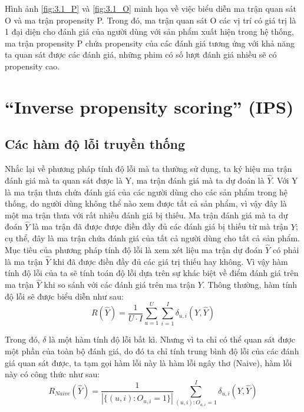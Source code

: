 Hình ảnh \ref{fig:3.1_P} và \ref{fig:3.1_O} minh họa về việc biểu diễn ma trận quan sát O và ma trận propensity P. Trong đó, ma trận quan sát O các vị trí có giá trị là 1 đại diện cho đánh giá của người dùng với sản phẩm xuất hiện trong hệ thống, ma trận propensity P chứa propensity của các đánh giá tương ứng với khả năng ta quan sát được các đánh giá, những phim có số lượt đánh giá nhiều sẽ có propensity cao.

\section{``Inverse propensity scoring'' (IPS)}
\subsection{Các hàm độ lỗi truyền thống}
Nhắc lại về phương pháp tính độ lỗi mà ta thường sử dụng, ta ký hiệu ma trận đánh giá mà ta quan sát được là Y, ma trận đánh giá mà ta dự đoán là $\hat{Y}$. Với Y là ma trận thưa chứa đánh giá của các người dùng cho các sản phẩm trong hệ thống, do người dùng không thể nào xem được tất cả sản phẩm, vì vậy đây là một ma trận thưa với rất nhiều đánh giá bị thiếu. Ma trận đánh giá mà ta dự đoán $\hat{Y}$ là ma trận đã được được điền đầy đủ các đánh giá bị thiếu từ mà trận $Y$; cụ thể, đây là ma trận chứa đánh giá của tất cả người dùng cho tất cả sản phẩm. Mục tiêu của phương pháp tính độ lỗi là xem xét liệu ma trận dự đoán $\hat{Y}$ có phải là ma trận $\hat{Y}$ khi đã được điền đầy đủ các giá trị thiếu hay không. Vì vậy hàm tính độ lỗi của ta sẽ tính toán độ lỗi dựa trên sự khác biệt về điểm đánh giá trên ma trận $\hat{Y}$ khi so sánh với các đánh giá trên ma trận $Y$. Thông thường, hàm tính độ lỗi sẽ được biểu diễn như sau:
\begin{equation}
\label{eq:tradition}
R(\hat{Y}) = \frac{1}{U\cdot I}  \sum_{u=1}^{U} \sum_{i=1}^{I} \delta_{u,i}(Y,\hat{Y})
\end{equation}

Trong đó, $\delta$ là một hàm tính độ lỗi bất kì.
Nhưng vì ta chỉ có thể quan sát được một phần của toàn bộ đánh giá, do đó ta chỉ tính trung bình độ lỗi của các đánh giá quan sát được, ta tạm gọi hàm lỗi này là hàm lỗi ngây thơ (Naive), hàm lỗi này có công thức như sau:
\begin{equation}
\label{eq:naive}
R_{Naive}(\hat{Y}) = \frac{1}{|\{(u,i):O_{u,i} = 1\}|} \sum_{(u,i):O_{u,i}=1}^{I} \delta_{u,i}(Y,\hat{Y}) 
\end{equation}


